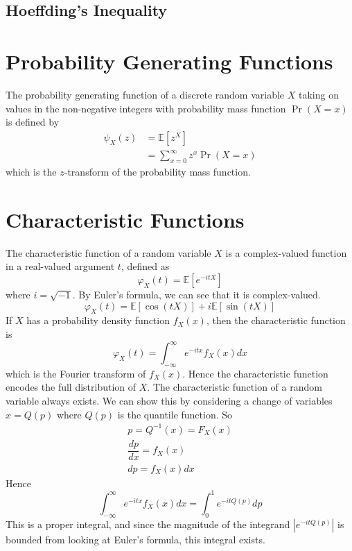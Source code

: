 \documentclass[11pt]{report} %
\begin{document}
\subsection{Hoeffding's Inequality}

\section{Probability Generating Functions}

The probability generating function of a discrete random variable $X$ taking on values in the non-negative integers with probability mass function $\operatorname{Pr}\left(X = x\right)$ is defined by
\begin{align}
\psi_{X}\left(z\right) &= \mathbb{E}\left[z^{X}\right] \\
&= \sum_{x = 0}^{\infty}z^{x}\operatorname{Pr}\left(X = x\right)
\end{align}
which is the $z$-transform of the probability mass function.

\section{Characteristic Functions}

The characteristic function of a random variable $X$ is a complex-valued function in a real-valued argument $t$, defined as
\begin{equation}
\varphi_{X}\left(t\right) = \mathbb{E}\left[e^{-itX}\right]
\end{equation}
where $i = \sqrt{-1}$. By Euler's formula, we can see that it is complex-valued.
\begin{equation}
\varphi_{X}\left(t\right) = \mathbb{E}\left[\cos\left(tX\right)\right] + i\mathbb{E}\left[\sin\left(tX\right)\right]
\end{equation}
If $X$ has a probability density function $f_{X}\left(x\right)$, then the characteristic function is
\begin{equation}
\varphi_{X}\left(t\right) = \int_{-\infty}^{\infty}e^{-itx}f_{X}\left(x\right)dx
\end{equation}
which is the Fourier transform of $f_{X}\left(x\right)$. Hence the characteristic function encodes the full distribution of $X$. The characteristic function of a random variable always exists. We can show this by considering a change of variables $x = Q\left(p\right)$ where $Q\left(p\right)$ is the quantile function. So
\begin{gather}
p = Q^{-1}\left(x\right) = F_{X}\left(x\right) \\
\dfrac{dp}{dx} = f_{X}\left(x\right) \\
dp = f_{X}\left(x\right)dx
\end{gather}
Hence
\begin{equation}
\int_{-\infty}^{\infty}e^{-itx}f_{X}\left(x\right)dx = \int_{0}^{1}e^{-itQ\left(p\right)}dp
\end{equation}
This is a proper integral, and since the magnitude of the integrand $\left|e^{-itQ\left(p\right)}\right|$ is bounded from looking at Euler's formula, this integral exists. \\
\end{document}
